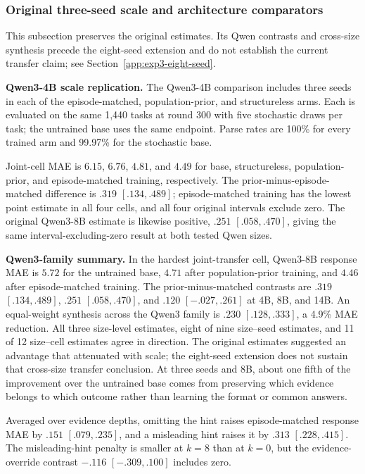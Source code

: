 \subsubsection{Original three-seed scale and architecture comparators}
\label{app:exp3-coin-qwen-results}

This subsection preserves the original estimates. Its Qwen contrasts and
cross-size synthesis precede the eight-seed extension and do not establish the
current transfer claim; see Section~\ref{app:exp3-eight-seed}.

\noindent\textbf{Qwen3-4B scale replication.}
\label{app:exp3-coin-qwen4b}
The Qwen3-4B comparison includes three seeds in each of the episode-matched,
population-prior, and structureless arms. Each is evaluated on the same 1,440
tasks at round 300 with five stochastic draws per task; the untrained base uses
the same endpoint. Parse rates are 100\% for every trained arm
and 99.97\% for the stochastic base.

Joint-cell MAE is $6.15$, $6.76$, $4.81$, and $4.49$ for base,
structureless, population-prior, and episode-matched training, respectively.
The prior-minus-episode-matched difference is $.319$ $[.134,.489]$;
episode-matched training has the lowest point estimate in all four cells, and
all four original intervals exclude zero. The original Qwen3-8B estimate is likewise positive,
$.251$ $[.058,.470]$, giving the same interval-excluding-zero result at both
tested Qwen sizes.

\noindent\textbf{Qwen3-family summary.}
In the hardest joint-transfer cell, Qwen3-8B response MAE is $5.72$ for the
untrained base, $4.71$ after population-prior training, and $4.46$ after
episode-matched training. The prior-minus-matched contrasts are $.319$
$[.134,.489]$, $.251$ $[.058,.470]$, and $.120$ $[-.027,.261]$ at 4B, 8B,
and 14B. An equal-weight synthesis across the Qwen3 family is $.230$
$[.128,.333]$, a 4.9\% MAE reduction. All three size-level estimates, eight of
nine size--seed estimates, and 11 of 12 size--cell estimates agree in direction.
The original estimates suggested an advantage that attenuated with scale;
the eight-seed extension does not sustain that cross-size transfer conclusion.
At three seeds and 8B, about one fifth of the improvement
over the untrained base comes from preserving which evidence belongs to which
outcome rather than learning the format or common answers.

Averaged over evidence depths, omitting the hint raises episode-matched response
MAE by $.151$ $[.079,.235]$, and a misleading hint raises it by $.313$
$[.228,.415]$. The misleading-hint penalty is smaller at $k=8$ than at $k=0$,
but the evidence-override contrast $-.116$ $[-.309,.100]$ includes zero.

